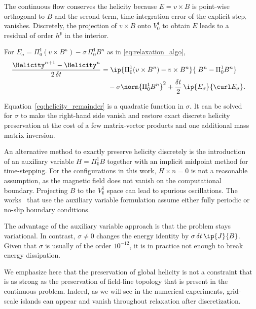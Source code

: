 \documentclass[%
 reprint,
 superscriptaddress,
 amsmath,amssymb,
 aps, nofootinbib, floatfix]{revtex4-2}
\begin{document}
The continuous flow conserves the helicity because $E = v \times B$ is point-wise orthogonal to $B$ and the second term, time-integration error of the explicit step, vanishes. Discretely, the projection of $v \times B$ onto $V^1_0$ to obtain $E$ leads to a residual of order $h^p$ in the interior.

\begin{corollary}
\label{prop:helicity_remainder}
    For $E_\sigma = \Pi^1_0 (v \times B^n) - \sigma \, \Pi^1_0 B^n$ as in \eqref{eq:relaxation_algo},
    \begin{align}
        \frac{\Helicity^{n+1} - \Helicity^{n}}{2 \, \delta t}
        &= \ip{\Pi^1_0 (v \times B^n) - v \times B^n}{\; B^n - \Pi^1_0 B^n} \notag \\
        &\quad - \sigma \norm{\Pi^1_0 B^n}^2 + \frac{\delta t}{2} \, \ip{E_\sigma}{\curl E_\sigma} .
        \label{eq:helicity_remainder}
    \end{align}
\end{corollary}

Equation~\ref{eq:helicity_remainder} is a quadratic function in $\sigma$. It can be solved for $\sigma$ to make the right-hand side vanish and restore exact discrete helicity preservation at the cost of a few matrix-vector products and one additional mass matrix inversion.

An alternative method to exactly preserve helicity discretely is the introduction of an auxiliary variable $H = \Pi^1_0 B$ together with an implicit midpoint method for time-stepping. For the configurations in this work, $H \times n = 0$ is not a reasonable assumption, as the magnetic field does not vanish on the computational boundary. Projecting $B$ to the $V^1_0$ space can lead to spurious oscillations. The works~\cite{bressan_2023_relaxation, he_topology-preserving_2025} that use the auxiliary variable formulation assume either fully periodic or no-slip boundary conditions.

The advantage of the auxiliary variable approach is that the problem stays variational. In contrast, $\sigma \neq 0$ changes the energy identity by $\sigma \, \delta t \, \ip{J}{B}$. Given that $\sigma$ is usually of the order $10^{-12}$, it is in practice not enough to break energy dissipation.

We emphasize here that the preservation of global helicity is not a constraint that is as strong as the preservation of field-line topology that is present in the continuous problem. Indeed, as we will see in the numerical experiments, grid-scale islands can appear and vanish throughout relaxation after discretization. 
\end{document}
